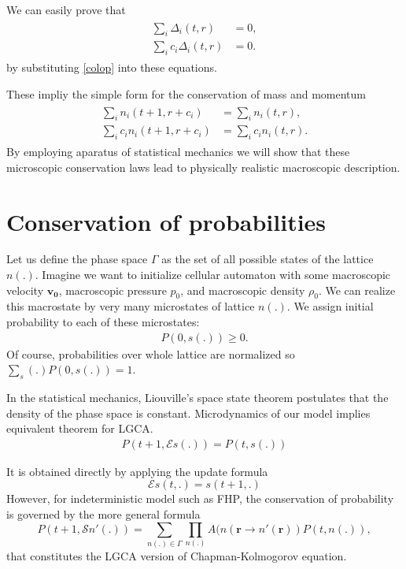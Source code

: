 We can easily prove that
\begin{align}
\begin{split}
\sum_i \Delta_i(t,r) &= 0,\\
\sum_i c_i \Delta_i(t,r) &= 0.
\end{split}
\end{align}
by substituting \ref{colop} into these equations.

These impliy the simple form for the conservation of mass and momentum
\begin{align} \label{cons1}
\begin{split}
\sum_i n_i(t+1, r + c_i) &= \sum_i n_i(t,r), \\
\sum_i c_i n_i(t+1, r + c_i) &= \sum_i c_i n_i(t,r).
\end{split}
\end{align}
By employing aparatus of statistical mechanics we will show that these microscopic conservation laws lead to physically realistic macroscopic description.

\section{Conservation of probabilities}
Let us define the phase space $\Gamma$ as the set of all possible states of the lattice $n(.)$.
Imagine we want to initialize cellular automaton with some macroscopic velocity $\bm{v_0}$, macroscopic pressure $p_0$, and macroscopic density $\rho_0$.
We can realize this macrostate by very many microstates of lattice $n(.)$.
We assign initial probability to each of these microstates:
\begin{align*}
P(0,s(.)) \geq 0.
\end{align*}
Of course, probabilities over whole lattice are normalized so
$\sum_s(.) P(0,s(.)) = 1$.

In the statistical mechanics, Liouville's space state theorem postulates that the density of the phase space is constant. Microdynamics of our model implies equivalent theorem for LGCA.
\begin{align*}
P(t+1, \mathcal{E} s(.)) = P(t, s(.))
\end{align*}

It is obtained directly by applying the update formula
\begin{equation*}
\mathcal{E} s(t,.) = s(t+1,.)
\end{equation*}
However, for indeterministic model such as FHP, the conservation of probability is governed by the more general formula
\begin{equation}
P(t+1,\mathcal{S} n'(.)) = \sum_{n(.) \in \Gamma} \prod_{n(.)} A(n(\bm{r} \rightarrow n'(\bm{r})) P(t, n(.)),
\end{equation}
that constitutes the LGCA version of Chapman-Kolmogorov equation.

